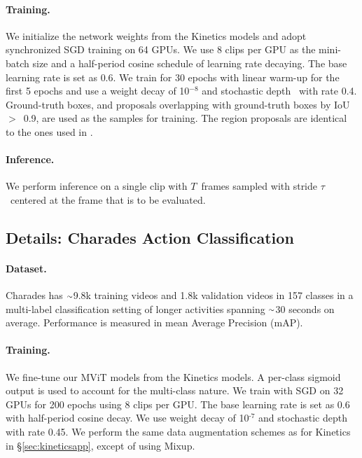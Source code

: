 \documentclass[10pt,twocolumn,letterpaper]{article}
\newcommand{\app}{\raise.17ex\hbox{$\scriptstyle\sim$}}
\begin{document}
\paragraph{Training.} 
We initialize the network weights from the Kinetics models and adopt synchronized SGD training on 64 GPUs. We use 8 clips per GPU as the mini-batch size and a half-period cosine schedule of learning rate decaying. The base learning rate is set as $0.6$.
We train for 30 epochs with linear warm-up \cite{Goyal2017} for the first 5 epochs and use a weight decay of 10$^{-8}$ and stochastic depth~\cite{huang2016deep} with rate 0.4.
Ground-truth boxes, and proposals overlapping with ground-truth boxes by \mbox{IoU $>$ 0.9}, are used as the samples for training. 
The region proposals are identical to the ones used in \cite{Feichtenhofer2019}.

\paragraph{Inference.} We perform inference on a single clip with $T$~frames sampled with stride $\tau$~centered at the frame that is to be evaluated.

\subsection{Details: Charades Action Classification}\label{sec:charades}
\paragraph{Dataset.}
Charades \cite{Sigurdsson2016} has $\app$9.8k training videos and 1.8k validation videos in 157 classes in a multi-label classification setting of longer activities spanning $\app$30 seconds on average. Performance is measured in mean Average Precision (mAP).

\paragraph{Training.} We fine-tune our MViT models from the Kinetics models.  A per-class sigmoid output is used to account for the multi-class nature. We train with SGD on 32 GPUs for 200 epochs using 8 clips per GPU. The base learning rate is set as 0.6 with half-period cosine decay. We use weight decay of 10$^\text{-7}$ and stochastic depth~\cite{huang2016deep} with rate 0.45. We perform the same data augmentation schemes as for Kinetics in \S\ref{sec:kineticsapp}, except of using Mixup.
\end{document}
